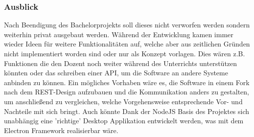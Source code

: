 \subsubsection{Ausblick}\label{sec:ausblick}
% 
Nach Beendigung des Bachelorprojekts soll dieses nicht verworfen werden sondern weiterhin privat ausgebaut werden. Während der Entwicklung kamen immer wieder Ideen für weitere Funktionalitäten auf, welche aber aus zeitlichen Gründen nicht implementiert worden sind oder nur als Konzept vorlagen. Dies wären z.B. Funktionen die den Dozent noch weiter während des Unterrichts unterstützen könnten oder das schreiben einer API, um die Software an andere Systeme anbinden zu können. Ein mögliches Vorhaben wäre es, die Software in einem Fork nach dem REST-Design aufzubauen und die Kommunikation anders zu gestalten, um anschließend zu vergleichen, welche Vorgehensweise entsprechende Vor- und Nachteile mit sich bringt. Auch könnte Dank der NodeJS Basis des Projektes sich unabhängig eine 'richtige' Desktop Applikation entwickelt werden, was mit dem Electron Framework realisierbar wäre.  
